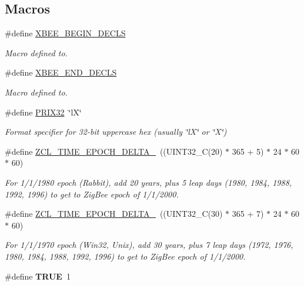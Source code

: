 \subsection*{Macros}
\begin{DoxyCompactItemize}
\item 
\#define \hyperlink{group__hal_ga336bff4f4a6012aacc4468132bbd3d7f}{X\-B\-E\-E\-\_\-\-B\-E\-G\-I\-N\-\_\-\-D\-E\-C\-L\-S}
\begin{DoxyCompactList}\small\item\em Macro defined to. \end{DoxyCompactList}\item 
\#define \hyperlink{group__hal_ga8d7f5a691878e9ffb7da396899581062}{X\-B\-E\-E\-\_\-\-E\-N\-D\-\_\-\-D\-E\-C\-L\-S}
\begin{DoxyCompactList}\small\item\em Macro defined to. \end{DoxyCompactList}\item 
\hypertarget{group__hal_ga32b0c8a04aae5d4454d15e6cbe109f64}{\#define \hyperlink{group__hal_ga32b0c8a04aae5d4454d15e6cbe109f64}{P\-R\-I\-X32}~\char`\"{}l\-X\char`\"{}}\label{group__hal_ga32b0c8a04aae5d4454d15e6cbe109f64}

\begin{DoxyCompactList}\small\item\em Format specifier for 32-\/bit uppercase hex (usually {\ttfamily \char`\"{}l\-X\char`\"{}} or {\ttfamily \char`\"{}\-X\char`\"{}}) \end{DoxyCompactList}\item 
\#define \hyperlink{group__hal_gaa1c89a351daab5e3d33a2dc48f85f9a4}{Z\-C\-L\-\_\-\-T\-I\-M\-E\-\_\-\-E\-P\-O\-C\-H\-\_\-\-D\-E\-L\-T\-A\-\_}~((U\-I\-N\-T32\-\_\-\-C(20) $\ast$ 365 + 5) $\ast$ 24 $\ast$ 60 $\ast$ 60)
\begin{DoxyCompactList}\small\item\em For 1/1/1980 epoch (Rabbit), add 20 years, plus 5 leap days (1980, 1984, 1988, 1992, 1996) to get to Zig\-Bee epoch of 1/1/2000. \end{DoxyCompactList}\item 
\#define \hyperlink{group__hal_ga735b0974380a73e9d7a12a1f199a5921}{Z\-C\-L\-\_\-\-T\-I\-M\-E\-\_\-\-E\-P\-O\-C\-H\-\_\-\-D\-E\-L\-T\-A\-\_}~((U\-I\-N\-T32\-\_\-\-C(30) $\ast$ 365 + 7) $\ast$ 24 $\ast$ 60 $\ast$ 60)
\begin{DoxyCompactList}\small\item\em For 1/1/1970 epoch (Win32, Unix), add 30 years, plus 7 leap days (1972, 1976, 1980, 1984, 1988, 1992, 1996) to get to Zig\-Bee epoch of 1/1/2000. \end{DoxyCompactList}\item 
\hypertarget{group__hal_gaa8cecfc5c5c054d2875c03e77b7be15d}{\#define {\bfseries T\-R\-U\-E}~1}\label{group__hal_gaa8cecfc5c5c054d2875c03e77b7be15d}


\end{DoxyCompactItemize}
